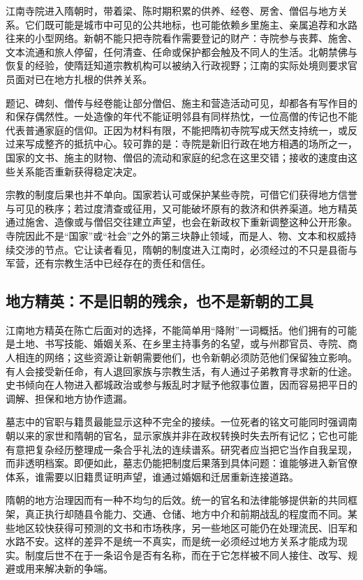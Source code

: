 江南寺院进入隋朝时，带着梁、陈时期积累的供养、经卷、房舍、僧侣与地方关系。它们既可能是城市中可见的公共地标，也可能依赖乡里施主、亲属追荐和水路往来的小型网络。新朝不能只把寺院看作需要登记的财产：寺院参与丧葬、施舍、文本流通和旅人停留，任何清查、任命或保护都会触及不同人的生活。北朝禁佛与恢复的经验，使隋廷知道宗教机构可以被纳入行政视野；江南的实际处境则要求官员面对已在地方扎根的供养关系。

题记、碑刻、僧传与经卷能让部分僧侣、施主和营造活动可见，却都各有写作目的和保存偶然性。一处造像的年代不能证明邻县有同样热忱，一位高僧的传记也不能代表普通家庭的信仰。正因为材料有限，不能把隋初寺院写成天然支持统一，或反过来写成整齐的抵抗中心。较可靠的是：寺院是新旧行政在地方相遇的场所之一，国家的文书、施主的财物、僧侣的流动和家庭的纪念在这里交错；接收的速度由这些关系能否重新获得稳定决定。

宗教的制度后果也并不单向。国家若认可或保护某些寺院，可借它们获得地方信誉与可见的秩序；若过度清查或征用，又可能破坏原有的救济和供养渠道。地方精英通过施舍、造像或与僧侣交往建立声望，也会在新政权下重新调整这种公开形象。寺院因此不是“国家”或“社会”之外的第三块静止领域，而是人、物、文本和权威持续交涉的节点。它让读者看见，隋朝的制度进入江南时，必须经过的不只是县衙与军营，还有宗教生活中已经存在的责任和信任。

\subsection{地方精英：不是旧朝的残余，也不是新朝的工具}

江南地方精英在陈亡后面对的选择，不能简单用“降附”一词概括。他们拥有的可能是土地、书写技能、婚姻关系、在乡里主持事务的名望，或与州郡官员、寺院、商人相连的网络；这些资源让新朝需要他们，也令新朝必须防范他们保留独立影响。有人会接受新任命，有人退回家族与宗教生活，有人通过子弟教育寻求新的仕途。史书倾向在人物进入都城政治或参与叛乱时才赋予他叙事位置，因而容易把平日的调解、担保和地方协作遗漏。

墓志中的官职与籍贯最能显示这种不完全的接续。一位死者的铭文可能同时强调南朝以来的家世和隋朝的官名，显示家族并非在政权转换时失去所有记忆；它也可能有意把复杂经历整理成一条合乎礼法的连续谱系。研究者应当把它当作自我呈现，而非透明档案。即便如此，墓志仍能把制度后果落到具体问题：谁能够进入新官僚体系，谁需要以旧籍贯证明声望，谁通过婚姻和迁居重新连接道路。

隋朝的地方治理因而有一种不均匀的后效。统一的官名和法律能够提供新的共同框架，真正执行却随县令能力、交通、仓储、地方中介和前期战乱的程度而不同。某些地区较快获得可预测的文书和市场秩序，另一些地区可能仍在处理流民、旧军和水路不安。这样的差异不是统一不真实，而是统一必须经过地方关系才能成为现实。制度后世不在于一条诏令是否有名称，而在于它怎样被不同人接住、改写、规避或用来解决新的争端。

